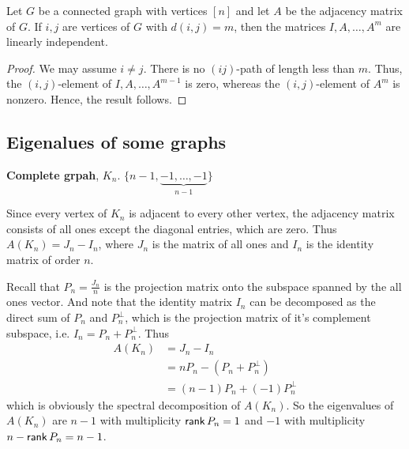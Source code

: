 \documentclass[../basic_graph_theory.tex]{subfiles}
\begin{document}
\begin{Thm}{}{}
  Let \(G\) be a connected graph with vertices \([n]\) and let \(A\) be the adjacency matrix of \(G\). If \(i, j\) are vertices of \(G\) with \(d(i, j) = m\), then the matrices \(I, A, \dots, A^m\) are linearly independent.
\end{Thm}
\begin{proof}
  We may assume \(i \not= j\). There is no \((ij)\)-path of length less than \(m\). Thus, the \((i, j)\)-element of \(I, A, \dots, A^{m-1}\) is zero, whereas the \((i, j)\)-element of \(A^m\) is nonzero. Hence, the result follows.
\end{proof}

\subsection*{Eigenalues of some graphs}

\begin{tcolorbox}[breakable]
  \textbf{Complete grpah}, \(K_n\). \(\big\{ n - 1, \underbrace{-1, \dots, -1}_{n - 1} \big\}\)

  \ssk

  Since every vertex of \(K_n\) is adjacent to every other vertex, the adjacency matrix consists of all ones except the diagonal entries, which are zero. Thus \(A(K_n) = J_n - I_n\), where \(J_n\) is the matrix of all ones and \(I_n\) is the identity matrix of order \(n\).

  Recall that \(P_n = \frac{J_n}{n}\) is the projection matrix onto the subspace spanned by the all ones vector. And note that the identity matrix \(I_n\) can be decomposed as the direct sum of \(P_n\) and \(P_n^{\perp}\), which is the projection matrix of it's complement subspace, i.e. \(I_n = P_n + P_n^{\perp}\). Thus
  \begin{align*}
    A(K_n)
     & = J_n - I_n                  \\
     & = nP_n - (P_n + P_n^{\perp}) \\
     & = (n-1)P_n + (-1)P_n^{\perp}
  \end{align*}
  which is obviously the spectral decomposition of \(A(K_n)\). So the eigenvalues of \(A(K_n)\) are \(n-1\) with multiplicity \(\operatorname{\mathsf{rank}} P_n = 1\) and \(-1\) with multiplicity \(n - \operatorname{\mathsf{rank}} P_n = n-1\).
\end{tcolorbox}
\end{document}
